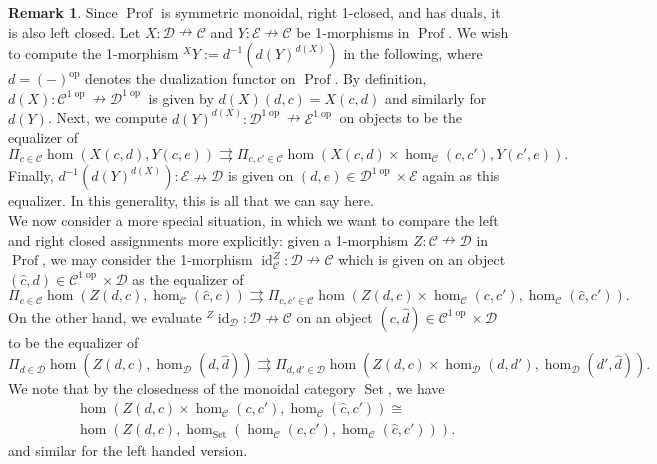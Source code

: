 \documentclass{article}
\newcommand{\Prof}{\operatorname{Prof}}%
\newcommand{\opp}{\operatorname{op}}%
\newcommand{\id}{\operatorname{id}}%
\newcommand{\Set}{\operatorname{Set}}%
\newcommand{\C}{\mathcal{C}}
\newcommand{\D}{\mathcal{D}}
\newcommand{\E}{\mathcal{E}}
\numberwithin{equation}{section}
\theoremstyle{definition}
\newtheorem{remark}[definition]{Remark}
\theoremstyle{theorem}
\begin{document}
\begin{remark}
    Since $\Prof$ is symmetric monoidal, right 1-closed, and has duals, it is also left closed. Let $X \colon \D \nrightarrow \C$ and $Y \colon \E \nrightarrow \C$
    be 1-morphisms in $\Prof$. We wish to compute the 1-morphism ${}^{X}\!Y :=  d^{-1}(d(Y)^{d(X)})$ in the following, where $d=(-)^{\opp}$ denotes the dualization 
    functor on $\Prof$. By definition, $d(X) \colon \C^{1\opp} \nrightarrow \D^{1\opp}$ is given by $d(X)(d,c) = X(c,d)$ and similarly for $d(Y)$. Next, we compute 
    $d(Y)^{d(X)} \colon \D^{1\opp} \nrightarrow \E^{1\opp}$ on objects to be the equalizer of
    \begin{equation}
        \Pi_{c \in \C} \hom(X(c,d),Y(c,e)) \rightrightarrows \Pi_{c,c' \in \C} \hom(X(c,d) \times \hom_{\C}(c,c'), Y(c',e)).
    \end{equation}
    Finally, $d^{-1}(d(Y)^{d(X)}) \colon \E \nrightarrow \D$ is given on $(d,e) \in \D^{1\opp} \times \E$ again as this equalizer.
    In this generality, this is all that we can say here. \\
    We now consider a more special situation, in which we want to compare the left and right closed assignments more explicitly: given a 1-morphism 
    $Z \colon \C \nrightarrow \D$ in $\Prof$, we may consider the 1-morphism 
    $\id_{\C}^Z \colon \D \nrightarrow \C$ which is given on an object $(\hat{c},d) \in \C^{1\opp} \times \D$ as the equalizer of
    \begin{equation}
        \Pi_{c \in \C} \hom(Z(d,c),\hom_{\C}(\hat{c},c)) \rightrightarrows \Pi_{c,c' \in \C} \hom(Z(d,c) \times \hom_{\C}(c,c'), \hom_{\C}(\hat{c},c')).
    \end{equation}
    On the other hand, we evaluate ${}^{Z}\!\id_{\D} \colon \D \nrightarrow \C$ on an object $(c,\hat{d}) \in \C^{1\opp} \times \D$ to be the equalizer of
    \begin{equation}
        \Pi_{d \in \D} \hom(Z(d,c),\hom_{\D}(d,\hat{d})) \rightrightarrows \Pi_{d,d' \in \D} \hom(Z(d,c) \times \hom_{\D}(d,d'),\hom_{\D}(d',\hat{d})).
    \end{equation}
    We note that by the closedness of the monoidal category $\Set$, we have 
    \begin{align*}
        &\hom(Z(d,c) \times \hom_{\C}(c,c'), \hom_{\C}(\hat{c},c')) \cong \\
        &\hom(Z(d,c),\hom_{\Set}(\hom_{\C}(c,c'),\hom_{\C}(\hat{c},c'))).
    \end{align*}
    and similar for the left handed version.
\end{remark}
\end{document}
